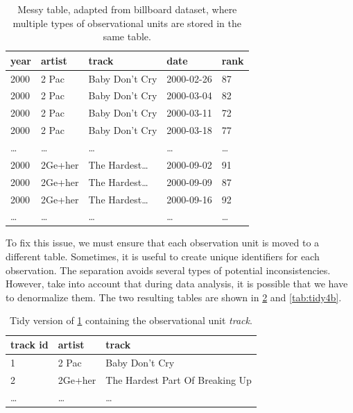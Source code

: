 \begin{table}
  \centering
  \begin{tabular}{lllll}
    \toprule
    \textbf{year} & \textbf{artist} & \textbf{track} & \textbf{date} & \textbf{rank} \\
    \midrule
    2000 & 2 Pac & Baby Don't Cry & 2000-02-26 & 87 \\
    2000 & 2 Pac & Baby Don't Cry & 2000-03-04 & 82 \\
    2000 & 2 Pac & Baby Don't Cry & 2000-03-11 & 72 \\
    2000 & 2 Pac & Baby Don't Cry & 2000-03-18 & 77 \\
    \dots & \dots & \dots & \dots & \dots \\
    2000 & 2Ge+her & The Hardest\dots & 2000-09-02 & 91 \\
    2000 & 2Ge+her & The Hardest\dots & 2000-09-09 & 87 \\
    2000 & 2Ge+her & The Hardest\dots & 2000-09-16 & 92 \\
    \dots & \dots & \dots & \dots & \dots \\
    \bottomrule
  \end{tabular}
  \caption{Messy table, adapted from billboard dataset, where multiple types of observational units are stored in the same table.}
  \label{tab:messy4}
\end{table}

To fix this issue, we must ensure that each observation unit is moved to a different table.
Sometimes, it is useful to create unique identifiers for each observation.
The separation avoids several types of potential inconsistencies.  However, take into
account that during data analysis, it is possible that we have to denormalize them.  The
two resulting tables are shown in \cref{tab:tidy4a} and \cref{tab:tidy4b}.

\begin{table}
  \centering
  \begin{tabular}{lll}
    \toprule
    \textbf{track id} & \textbf{artist} & \textbf{track} \\
    \midrule
    1 & 2 Pac & Baby Don't Cry \\
    2 & 2Ge+her & The Hardest Part Of Breaking Up \\
    \dots & \dots & \dots \\
    \bottomrule
  \end{tabular}
  \caption{Tidy version of \cref{tab:messy4} containing the observational unit \emph{track}.}
  \label{tab:tidy4a}
\end{table}

